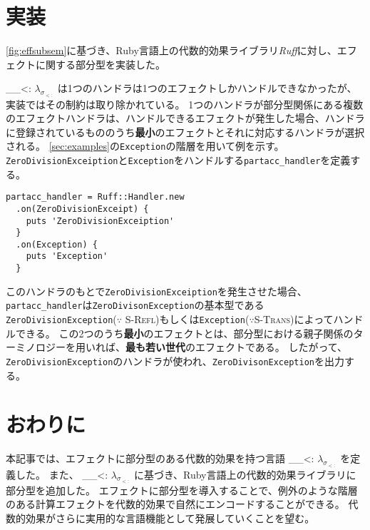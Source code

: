 \documentclass{ltjsarticle}
\def\effsub{
  \ifmmode
    \lambda_{\sigma_{<:}}
  \else
    $\lambda_{\sigma_{<:}}$
  \fi
}
\begin{document}
\section{実装}
\autoref{fig:effsubsem}に基づき、Ruby言語上の代数的効果ライブラリ\textit{Ruff}に対し、エフェクトに関する部分型を実装した。
\effsub{}は1つのハンドラは1つのエフェクトしかハンドルできなかったが、実装ではその制約は取り除かれている。
1つのハンドラが部分型関係にある複数のエフェクトハンドラは、ハンドルできるエフェクトが発生した場合、ハンドラに登録されているもののうち\textbf{最小}のエフェクトとそれに対応するハンドラが選択される。
\autoref{sec:examples}の\texttt{Exception}の階層を用いて例を示す。
\lstinline{ZeroDivisionExceiption}と\lstinline{Exception}をハンドルする\lstinline{partacc_handler}を定義する。
\begin{lstlisting}
partacc_handler = Ruff::Handler.new
  .on(ZeroDivisionExceipt) {
    puts 'ZeroDivisionExceiption'
  }
  .on(Exception) {
    puts 'Exception'
  }
\end{lstlisting}
このハンドラのもとで\lstinline{ZeroDivisionExceiption}を発生させた場合、\lstinline{partacc_handler}は\lstinline{ZeroDivisonException}の基本型である\lstinline{ZeroDivisionException}($\because$ \textsc{S-Refl})もしくは\lstinline{Exception}($\because$\textsc{S-Trans})によってハンドルできる。
この2つのうち\textbf{最小}のエフェクトとは、部分型における親子関係のターミノロジーを用いれば、\textbf{最も若い世代}のエフェクトである。
したがって、\lstinline{ZeroDivisionException}のハンドラが使われ、\lstinline{ZeroDivisonException}を出力する。

\section{おわりに}
本記事では、エフェクトに部分型のある代数的効果を持つ言語\effsub{}を定義した。
また、\effsub{}に基づき、Ruby言語上の代数的効果ライブラリに部分型を追加した。
エフェクトに部分型を導入することで、例外のような階層のある計算エフェクトを代数的効果で自然にエンコードすることができる。
代数的効果がさらに実用的な言語機能として発展していくことを望む。

\printbibliography
\end{document}
